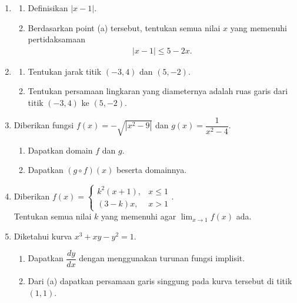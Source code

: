 \documentclass[10pt,openany,a4paper]{article}
\theoremstyle{definition}
\theoremstyle{definition}
\theoremstyle{plain}
\begin{document}
\begin{enumerate}
    \item \begin{enumerate}
        \item Definisikan $|x-1|$.
        \item Berdasarkan point (a) tersebut, tentukan semua nilai $x$ yang memenuhi pertidaksamaan
        \begin{align*}
            |x-1|\leq 5-2x.
        \end{align*}
    \end{enumerate}

    \item \begin{enumerate}
        \item Tentukan jarak titik $(-3,4)$ dan $(5,-2)$.
        \item Tentukan persamaan lingkaran yang diameternya adalah ruas garis dari titik $(-3,4)$ ke $(5,-2)$.
    \end{enumerate}

    \item Diberikan fungsi $f(x)=-\sqrt{|x^2-9|}$ dan $g(x)=\dfrac{1}{x^2-4}$.
    \begin{enumerate}
        \item Dapatkan domain $f$ dan $g$.
        \item Dapatkan $(g\circ f)(x)$ beserta domainnya.
    \end{enumerate}

    \item Diberikan $f(x)=\begin{cases}
        k^2(x+1), & x\leq 1\\
        (3-k)x, & x>1
    \end{cases}$.\\
    Tentukan semua nilai $k$ yang memenuhi agar $\displaystyle\lim_{x\to 1}f(x)$ ada.

    \item Diketahui kurva $x^3+xy-y^2=1$.
    \begin{enumerate}
        \item Dapatkan $\dfrac{dy}{dx}$ dengan menggunakan turunan fungsi implisit.
        \item Dari (a) dapatkan persamaan garis singgung pada kurva tersebut di titik $(1,1)$.
    \end{enumerate}
\end{enumerate}
\end{document}
